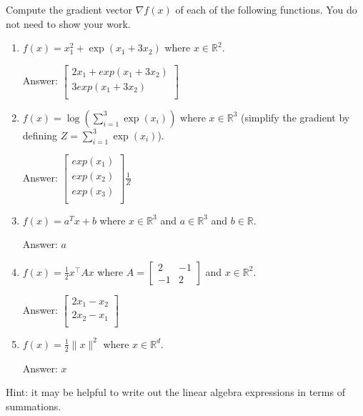 \documentclass{article}
\newcommand{\blu}[1]{{\textcolor{blu}{#1}}}
\newenvironment{answer}{\par\begingroup\color{gre}Answer: }{\endgroup}
\let\ask\blu
\def\R{\mathbb{R}}
\newcommand{\norm}[1]{\lVert #1 \rVert}
\begin{document}
  \ask{Compute the gradient vector $\nabla f(x)$ of each of the following functions.} You do not need to show your work.
  \begin{enumerate}
  \item $f(x) = x_1^2 + \exp(x_1 + 3x_2)$ where $x \in \R^2$.
  \begin{answer}
    $\left[ \begin{array}{c}
      2x_1 + exp(x_1 + 3x_2) \\
      3exp(x_1 + 3x_2) \\
    \end{array} \right]$
  \end{answer}
  \item $f(x) = \log\left(\sum_{i=1}^3\exp(x_i)\right)$ where $x \in \R^3$ (simplify the gradient by defining $Z = \sum_{i=1}^3\exp(x_i)$).
  \begin{answer}
    $ \left[ \begin{array}{c}
      exp(x_1)\\
      exp(x_2)\\
      exp(x_3)\\
    \end{array}\right]\frac{1}{Z} $
  \end{answer}
  \item $f(x) = a^Tx + b$ where $x \in \R^3$ and $a \in \R^3$ and $b \in \R$.
  \begin{answer}
    $a$
  \end{answer}
  \item $f(x) = \frac12 x^\top A x$ where $A=\left[ \begin{array}{cc}
  2 & -1 \\
  -1 & 2 \end{array} \right]$ and $x \in \mathbb{R}^2$.
  \begin{answer}
    $ \left[ \begin{array}{c}
      2x_1 - x_2 \\
      2x_2 - x_1 \\
    \end{array} \right] $
  \end{answer}
  \item $f(x) = \frac{1}{2}\norm{x}^2$ where $x \in \R^d$.
  \begin{answer}
    $ x$
  \end{answer}
  \end{enumerate}

  Hint: it may be helpful to write out the linear algebra expressions in terms of summations.
\end{document}
